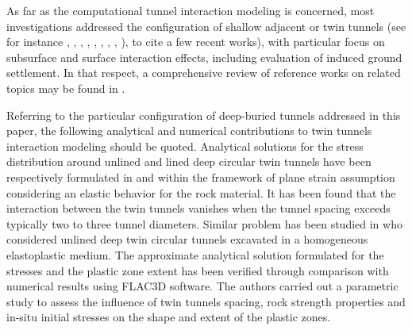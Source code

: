 \documentclass[Journal,letterpaper, NoLists,SectionNumbers]{ascelike-new}
\begin{document}
As far as the computational tunnel interaction modeling is concerned, most investigations addressed the configuration of shallow adjacent or twin tunnels (see for instance , , , , , , ,  , ), to cite a few recent works), with particular focus on subsurface and surface interaction effects, including evaluation of induced ground settlement. In that respect, a comprehensive review of reference works on related topics may be found in .

Referring to the particular configuration of deep-buried tunnels addressed in this paper, the following analytical and numerical contributions to twin tunnels interaction modeling should be quoted. Analytical solutions for the stress distribution around unlined and lined deep circular twin tunnels have been respectively formulated in  and  within the framework of plane strain assumption considering an elastic behavior for the rock material. It has been found that the interaction between the twin tunnels vanishes when the tunnel spacing exceeds typically two to three tunnel diameters. Similar problem has been studied in  who considered unlined deep twin circular tunnels excavated in a homogeneous elastoplastic medium. The approximate analytical solution formulated for the stresses and the plastic zone extent has been verified through comparison with numerical results using FLAC3D software. The authors carried out a parametric study to assess the influence of twin tunnels spacing, rock strength properties and in-situ initial stresses on the shape and extent of the plastic zones.
\end{document}

